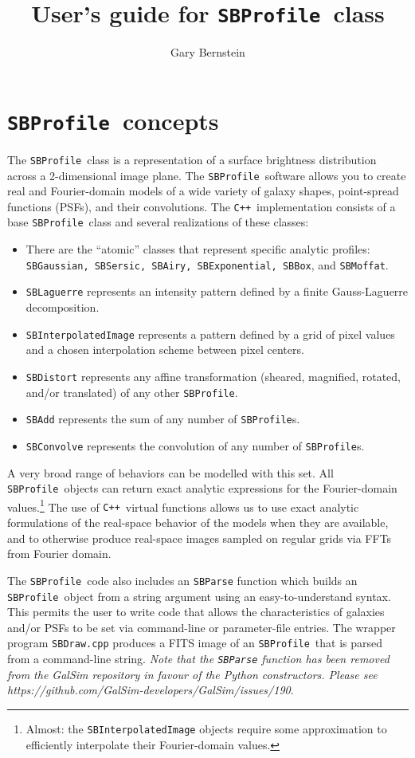 \documentclass[11pt,preprint,flushrt]{aastex}
\begin{document}
\def\cpp{{\tt C++}}
\def\sbp{{\tt SBProfile}}
\def\sbph{{\tt SBProfile.h}}
\def\eqq#1{Equation~(\ref{#1})}

\title{User's guide for \sbp\ class}
\author{Gary Bernstein}

\section{\sbp\ concepts}
The \sbp\ class is a representation of a surface brightness distribution across a 2-dimensional image plane.
The \sbp\ software allows you to create real and Fourier-domain models of a wide variety of galaxy shapes, point-spread functions (PSFs), and their convolutions.  The \cpp\ implementation consists of a base \sbp\ class and several realizations of these classes:
\begin{itemize}
\item There are the ``atomic'' classes that represent specific analytic profiles: {\tt SBGaussian, SBSersic, SBAiry, SBExponential, SBBox}, and {\tt SBMoffat}.
\item {\tt SBLaguerre} represents an intensity pattern defined by a finite Gauss-Laguerre decomposition.
\item {\tt SBInterpolatedImage} represents a pattern defined by a grid of pixel values and a chosen interpolation scheme between pixel centers.
\item {\tt SBDistort} represents any affine transformation (sheared, magnified, rotated, and/or translated) of any other \sbp.
\item {\tt SBAdd} represents the sum of any number of {\sbp}s.
\item {\tt SBConvolve} represents the convolution of any number of {\sbp}s.
\end{itemize}
A very broad range of behaviors can be modelled with this set.  All \sbp\ objects can return exact analytic expressions for the Fourier-domain values.\footnote{Almost: the {\tt SBInterpolatedImage} objects require some approximation to efficiently interpolate their Fourier-domain values.}  The use of \cpp\ virtual functions allows us to use exact analytic formulations of the real-space behavior of the models when they are available, and to otherwise produce real-space images sampled on regular grids via FFTs from Fourier domain.  

The \sbp\ code also includes an {\tt SBParse} function which builds an \sbp\ object from a string argument using an easy-to-understand syntax.  This permits the user to write code that allows the characteristics of galaxies and/or PSFs to be set via command-line or parameter-file entries.  The wrapper program {\tt SBDraw.cpp} produces a FITS image of an \sbp\ that is parsed from a command-line string.   \emph{Note that the {\tt SBParse} function has been removed from the GalSim repository in favour of the Python constructors.  Please see https://github.com/GalSim-developers/GalSim/issues/190}.
\end{document}
